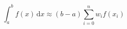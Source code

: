 \documentclass{article}
\begin{document}
\[
  \int_a^b f(x)\,\mathrm{d}x \approx (b-a)
  \sum_{i=0}^n w_i f(x_i)
\]
\end{document}
